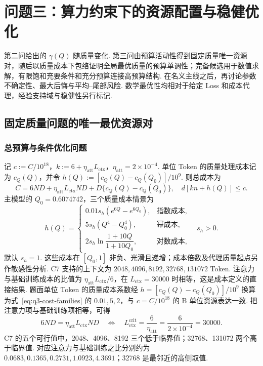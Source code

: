 \section{问题三：算力约束下的资源配置与稳健优化}\label{sec:q3}

第二问给出的 $\gamma(Q)$ 随质量变化. 第三问由预算活动性得到固定质量唯一资源对，随后以质量成本下包络证明全局最优质量的预算单调性；完备候选用于数值求解，有限饱和充要条件和充分预算连接高预算结构. 在名义主线之后，再讨论参数不确定性、最大后悔与平均--尾部风险. 数学最优性均相对于给定 Loss 和成本代理，经验支持域与稳健性另行标记. 

\subsection{固定质量问题的唯一最优资源对}

\subsubsection{总预算与条件优化问题}
记 $c:=C/10^{18}$，$k:=6+\eta_{\mathrm{att}}L_{\mathrm{ctx}}$，$\eta_{\mathrm{att}}=2\times10^{-4}$. 单位 Token 的质量处理成本记为 $c_Q(Q)$，并令 $h(Q):=[c_Q(Q)-c_Q(Q_0)]/10^9$. 则总成本为
\begin{equation}\label{eq:q3-budget-v26}
C=6ND+\eta_{\mathrm{att}}L_{\mathrm{ctx}}ND+D\{c_Q(Q)-c_Q(Q_0)\},
\quad d[kn+h(Q)]\le c.
\end{equation}
主模型的 $Q_0=0.6074742$，三个质量成本情景为
\begin{equation}\label{eq:q3-cost-families}
h(Q)=\begin{cases}
0.01s_h(e^{6Q}-e^{6Q_0}),&\text{指数成本},\\
5s_h(Q^4-Q_0^4),&\text{幂成本},\\
2s_h\ln\!\dfrac{1+10Q}{1+10Q_0},&\text{对数成本},
\end{cases}\quad s_h>0.
\end{equation}
默认 $s_h=1$. 这些成本在 $[Q_0,1]$ 非负、光滑且递增；成本倍数及代理质量起点另作敏感性分析. C7 支持的上下文为 $2048,4096,8192,32768,131072$ Token. 注意力与基础训练成本的比值为 $\eta_{\mathrm{att}}L_{\mathrm{ctx}}/6$，在 $L_{\mathrm{ctx}}=30000$ 时相等，这是成本定义的直接结果. 
题面单位 Token 的质量成本系数经 $h=[c_Q(Q)-c_Q(Q_0)]/10^9$ 换算为式~\eqref{eq:q3-cost-families} 的 $0.01,5,2$，与 $c=C/10^{18}$ 的 B 单位资源表达一致. 把注意力项与基础训练项相等，可得
\begin{equation}\label{eq:q3-v39-critical-context}
6ND=\eta_{\mathrm{att}}L_{\mathrm{ctx}}ND
\quad\Longleftrightarrow\quad
L_{\mathrm{ctx}}^{\mathrm{crit}}
=\frac6{\eta_{\mathrm{att}}}=\frac6{2\times10^{-4}}=30000.
\end{equation}
C7 的五个可行值中，2048、4096、8192 三个低于临界值；32768、131072 两个高于临界值. 对应注意力与基础训练之比分别约为 $0.0683,0.1365,0.2731,1.0923,4.3691$；32768 是最邻近的高侧取值. 

